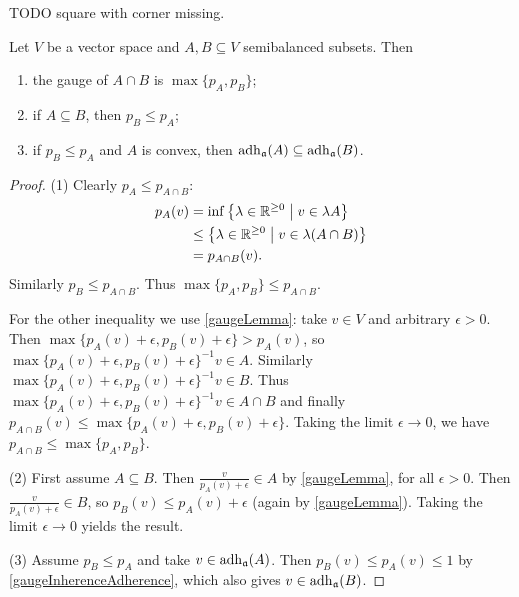 \begin{example}
TODO square with corner missing.
\end{example}



\begin{proposition} \label{gaugeConstructions}
Let $V$ be a vector space and $A,B\subseteq V$ semibalanced subsets. Then
\begin{enumerate}
\item the gauge of $A\cap B$ is $\max\{p_A, p_B\}$;
\item if $A\subseteq B$, then $p_B \leq p_A$;
\item if $p_B \leq p_A$ and $A$ is convex, then $\operatorname{adh}_\mathfrak{a}(A) \subseteq \operatorname{adh}_\mathfrak{a}(B)$.
\end{enumerate}
\end{proposition}
\begin{proof}
(1) Clearly $p_A \leq p_{A\cap B}$:
\begin{align*}
p_A(v) &= \inf\left\{ \lambda\in\mathbb{R}^{\geq 0} \;\middle|\; v\in \lambda A \right\} \\
&\leq \left\{ \lambda\in\mathbb{R}^{\geq 0} \;\middle|\; v\in \lambda (A\cap B) \right\} \\
&= p_{A\cap B}(v).
\end{align*}
Similarly $p_B \leq p_{A\cap B}$. Thus $\max\{p_A, p_B\} \leq p_{A\cap B}$.

For the other inequality we use \ref{gaugeLemma}: take $v\in V$ and arbitrary $\epsilon > 0$. Then $\max\{p_A(v)+\epsilon, p_B(v)+\epsilon\} > p_A(v)$, so $\max\{p_A(v)+\epsilon, p_B(v)+\epsilon\}^{-1}v\in A$. Similarly $\max\{p_A(v)+\epsilon, p_B(v)+\epsilon\}^{-1}v\in B$. Thus $\max\{p_A(v)+\epsilon, p_B(v)+\epsilon\}^{-1}v \in A\cap B$ and finally $p_{A\cap B}(v) \leq \max\{p_A(v)+\epsilon, p_B(v)+\epsilon\}$. Taking the limit $\epsilon \to 0$, we have $p_{A\cap B} \leq \max\{p_A, p_B\}$.

(2) First assume $A\subseteq B$. Then $\frac{v}{p_A(v)+\epsilon}\in A$ by \ref{gaugeLemma}, for all $\epsilon >0$. Then $\frac{v}{p_A(v)+\epsilon}\in B$, so $p_B(v) \leq p_A(v)+\epsilon$ (again by \ref{gaugeLemma}). Taking the limit $\epsilon\to 0$ yields the result.

(3) Assume $p_B \leq p_A$ and take $v\in \operatorname{adh}_\mathfrak{a}(A)$. Then $p_B(v) \leq p_A(v) \leq 1$ by \ref{gaugeInherenceAdherence}, which also gives $v\in\operatorname{adh}_\mathfrak{a}(B)$.
\end{proof}

